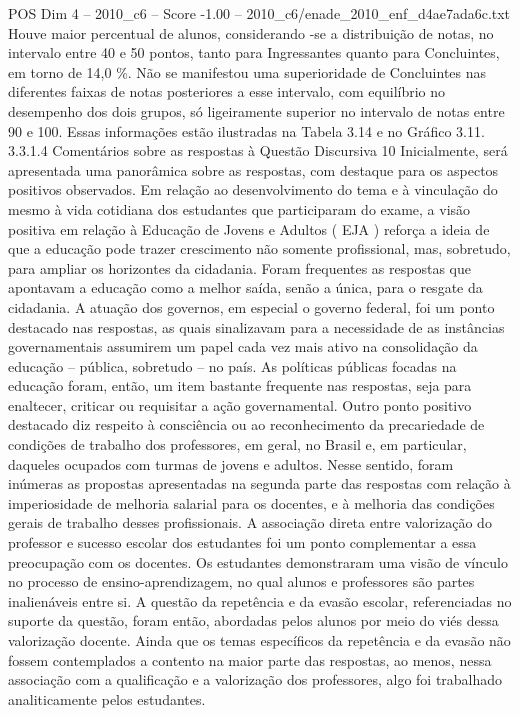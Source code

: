 \begin{textsample}{POS Dim 4 – 2010\_c6 – Score -1.00 – 2010\_c6/enade\_2010\_enf\_d4ae7ada6c.txt}
Houve maior percentual de alunos, considerando -se a distribuição de notas, no intervalo entre 40 e 50 pontos, tanto para Ingressantes quanto para Concluintes, em torno de 14,0 \%.
Não se manifestou uma superioridade de Concluintes nas diferentes faixas de notas posteriores a esse intervalo, com equilíbrio no desempenho dos dois grupos, só ligeiramente superior no intervalo de notas entre 90 e 100.
Essas informações estão ilustradas na Tabela 3.14 e no Gráfico 3.11. 3.3.1.4 Comentários sobre as respostas à Questão Discursiva 10 Inicialmente, será apresentada uma panorâmica sobre as respostas, com destaque para os aspectos positivos observados.
Em relação ao desenvolvimento do tema e à vinculação do mesmo à vida cotidiana dos estudantes que participaram do exame, a visão positiva em relação à Educação de Jovens e Adultos ( EJA ) reforça a ideia de que a educação pode trazer crescimento não somente profissional, mas, sobretudo, para ampliar os horizontes da cidadania.
Foram frequentes as respostas que apontavam a educação como a melhor saída, senão a única, para o resgate da cidadania.
A atuação dos governos, em especial o governo federal, foi um ponto destacado nas respostas, as quais sinalizavam para a necessidade de as instâncias governamentais assumirem um papel cada vez mais ativo na consolidação da educação – pública, sobretudo – no país.
As políticas públicas focadas na educação foram, então, um item bastante frequente nas respostas, seja para enaltecer, criticar ou requisitar a ação governamental.
Outro ponto positivo destacado diz respeito à consciência ou ao reconhecimento da precariedade de condições de trabalho dos professores, em geral, no Brasil e, em particular, daqueles ocupados com turmas de jovens e adultos.
Nesse sentido, foram inúmeras as propostas apresentadas na segunda parte das respostas com relação à imperiosidade de melhoria salarial para os docentes, e à melhoria das condições gerais de trabalho desses profissionais.
A associação direta entre valorização do professor e sucesso escolar dos estudantes foi um ponto complementar a essa preocupação com os docentes.
Os estudantes demonstraram uma visão de vínculo no processo de ensino-aprendizagem, no qual alunos e professores são partes inalienáveis entre si.
A questão da repetência e da evasão escolar, referenciadas no suporte da questão, foram então, abordadas pelos alunos por meio do viés dessa valorização docente.
Ainda que os temas específicos da repetência e da evasão não fossem contemplados a contento na maior parte das respostas, ao menos, nessa associação com a qualificação e a valorização dos professores, algo foi trabalhado analiticamente pelos estudantes.

\end{textsample}
